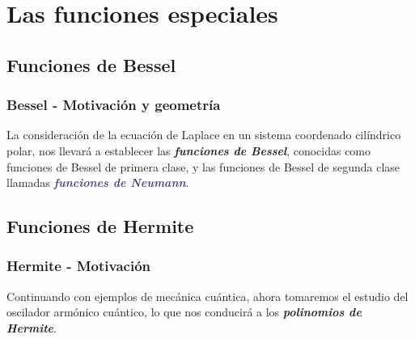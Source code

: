 \documentclass[12pt]{beamer}
\begin{document}
\section{Las funciones especiales}



\subsection{Funciones de Bessel}

\begin{frame}
\frametitle{Bessel - Motivación y geometría}
La consideración de la ecuación de Laplace en un sistema coordenado cilíndrico polar, nos llevará a establecer las \emph{\textbf{\textcolor{debianred}{funciones de Bessel}}}, conocidas como funciones de Bessel de primera clase, \pause y las funciones de Bessel de segunda clase llamadas \emph{\textbf{\textcolor{darkslateblue}{funciones de Neumann}}}.
\end{frame}

\subsection{Funciones de Hermite}

\begin{frame}
\frametitle{Hermite - Motivación}
Continuando con ejemplos de mecánica cuántica, ahora tomaremos el estudio del oscilador armónico cuántico, lo que nos conducirá a los \emph{\textbf{\textcolor{darkterracotta}{polinomios de Hermite}}}.
\end{frame}
\end{document}
